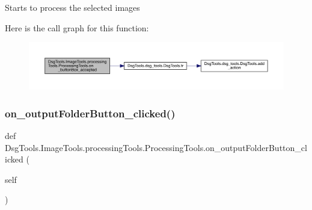 \begin{DoxyVerb}Starts to process the selected images
\end{DoxyVerb}
 Here is the call graph for this function\+:
\nopagebreak
\begin{figure}[H]
\begin{center}
\leavevmode
\includegraphics[width=350pt]{class_dsg_tools_1_1_image_tools_1_1processing_tools_1_1_processing_tools_afd52af3160c2c4221b8cb58b2b8e2ae9_cgraph}
\end{center}
\end{figure}
\mbox{\label{class_dsg_tools_1_1_image_tools_1_1processing_tools_1_1_processing_tools_a96c93e9a3401f46a7280ce394031513e}} 
\subsubsection{\texorpdfstring{on\+\_\+output\+Folder\+Button\+\_\+clicked()}{on\_outputFolderButton\_clicked()}}
{\footnotesize\ttfamily def Dsg\+Tools.\+Image\+Tools.\+processing\+Tools.\+Processing\+Tools.\+on\+\_\+output\+Folder\+Button\+\_\+clicked (\begin{DoxyParamCaption}\item[{}]{self }\end{DoxyParamCaption})}

